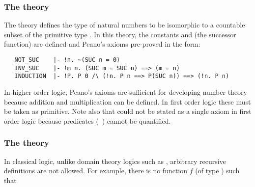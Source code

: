 \subsubsection{The theory }

The theory 
defines the type  of natural numbers to be
isomorphic to a countable subset of the primitive type .  In this
theory, the constants 
and  (the successor function) are defined
and Peano's axioms
pre-proved in the form:

\begin{hol}
\begin{verbatim}
   NOT_SUC    |- !n. ~(SUC n = 0)
   INV_SUC    |- !m n. (SUC m = SUC n) ==> (m = n)
   INDUCTION  |- !P. P 0 /\ (!n. P n ==> P(SUC n)) ==> (!n. P n)
\end{verbatim}
\end{hol}

In higher order logic, Peano's axioms are sufficient for developing number
theory because addition and multiplication can be defined. In first order
logic these must be taken as primitive.  Note also that
could not be stated as a single axiom in first order logic because
predicates (\eg\ ) cannot be quantified.

\subsubsection{The theory }\label{prim_rec}

In classical logic, unlike domain theory logics such as \PPL{},
arbitrary recursive definitions are not allowed. For example, there is no
function $f$ (of type ) such that

